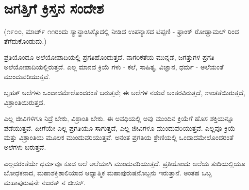 
\chapter{ಜಗತ್ತಿಗೆ ಕ್ರಿಸ್ತನ ಸಂದೇಶ}

(೧೯೦೦, ಮಾರ್ಚ್ ೧೧ರಂದು ಸ್ಯಾನ್ಫ್ರಾಂಸಿಸ್ಕೊದಲ್ಲಿ ನೀಡಿದ ಉಪನ್ಯಾಸದ ಟಿಪ್ಪಣಿ - ಫ್ರಾಂಕ್ ರೋಡ್ಹಾಮಲ್ ರಿಂದ ತೆಗೆದುಕೊಂಡುದು.)

ಪ್ರತಿಯೊಂದೂ ಅಲೆಯೋಪಾದಿಯಲ್ಲಿ ಪ್ರಗತಿಹೊಂದುತ್ತದೆ. ನಾಗರಿಕತೆಯ ಮುನ್ನಡೆ, ಜಗತ್ತುಗಳ ಪ್ರಗತಿ ಅಲೆಯೋಪಾದಿಯಲ್ಲಿರುತ್ತದೆ. ಎಲ್ಲ ಮಾನವ ಕ್ರಿಯೆ ಗಳು - ಕಲೆ, ಸಾಹಿತ್ಯ, ವಿಜ್ಞಾನ, ಧರ್ಮ - ಅಲೆಯಂತೆ ಮುಂದುವರಿಯುತ್ತವೆ.

ಬೃಹತ್ ಅಲೆಗಳು ಒಂದಾದಮೇಲೊಂದರಂತೆ ಬರುತ್ತವೆ; ಈ ಅಲೆಗಳ ನಡುವೆ ಅಂತರವಿರುತ್ತದೆ, ಶಾಂತತೆಯಿರುತ್ತದೆ, ವಿಶ್ರಾಂತಿಯಿರುತ್ತದೆ.

ಎಲ್ಲ ಜೀವಿಗಳಿಗೂ ನಿದ್ರೆ ಬೇಕು, ವಿಶ್ರಾಂತಿ ಬೇಕು. ಈ ಅವಧಿಯಲ್ಲಿ ಅವು ಮುಂದಿನ ಕ್ರಿಯೆಗೆ ಹೊಸ ಶಕ್ತಿಯನ್ನೂ ಪಡೆಯುತ್ತವೆ. ಹೀಗೆಯೇ ಎಲ್ಲ ಪ್ರಗತಿಯೂ ಸಾಗುತ್ತದೆ, ಎಲ್ಲ ಜೀವಿಗಳೂ ಮುಂದುವರಿಯುತ್ತವೆ. ಎಲ್ಲವೂ ಕ್ರಿಯೆ ಮತ್ತು ವಿಶ್ರಾಂತಿಯ ಮೂಲಕ ಮುಂದುವರಿಯುತ್ತವೆ. ಅನಂತ ಪ್ರಗತಿಯ ಶ್ರೇಣಿಯಲ್ಲಿ ಒಂದಾದಮೇಲೊಂದರಂತೆ ಅಲೆಗಳು ಬರುತ್ತವೆ.

ಎಲ್ಲದರಂತೆಯೇ ಧರ್ಮವೂ ಕೂಡ ಅಲೆ ಅಲೆಯಾಗಿ ಮುಂದುವರಿಯುತ್ತದೆ. ಪ್ರತಿಯೊಂದು ಅಲೆಯ ತುದಿಯಲ್ಲಿಯೂ ಬೋಧಕನಾದ, ಮಹಾಶಕ್ತಿಶಾಲಿಯಾದ ಆಧ್ಯಾತ್ಮಿಕ ಮಹಾಪುರುಷನೊಬ್ಬನು ಇರುತ್ತಾನೆ. ಅಂತಹ ಒಬ್ಬ ಮಹಾಪುರುಷನೇ ನಜರತ್ ನ ಜೀಸಸ್.

